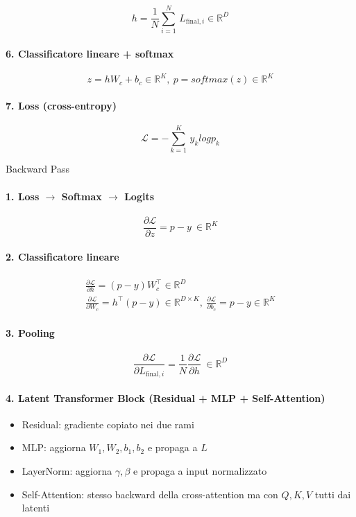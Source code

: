 \documentclass[
  11pt,
]{article}
\begin{document}
\[h = \frac{1}{N}\sum_{i = 1}^{N}\, L_{\text{final},i} \in \mathbb{R}^{D}\]

\paragraph{6. Classificatore lineare + softmax}

\[z = hW_{c} + b_{c} \in \mathbb{R}^{K},\ p = softmax(z) \in \mathbb{R}^{K}\]

\paragraph{7. Loss (cross-entropy)}

\[\mathcal{L} = - \sum_{k = 1}^{K}\, y_{k}logp_{k}\]

Backward Pass

\paragraph{1. Loss $\rightarrow$ Softmax $\rightarrow$ Logits}

\[\frac{\partial\mathcal{L}}{\partial z} = p - y\  \in \mathbb{R}^{K}\]

\paragraph{2. Classificatore lineare}

\[\begin{matrix}
\frac{\partial\mathcal{L}}{\partial h} = (p - y)W_{c}^{\top} \in \mathbb{R}^{D} \\
\frac{\partial\mathcal{L}}{\partial W_{c}} = h^{\top}(p - y) \in \mathbb{R}^{D \times K},\ \frac{\partial\mathcal{L}}{\partial b_{c}} = p - y \in \mathbb{R}^{K}
\end{matrix}\]

\paragraph{3. Pooling}

\[\frac{\partial\mathcal{L}}{\partial L_{\text{final},i}} = \frac{1}{N}\frac{\partial\mathcal{L}}{\partial h}\  \in \mathbb{R}^{D}\]

\paragraph{4. Latent Transformer Block (Residual + MLP + Self-Attention)}

\begin{itemize}
\item
  Residual: gradiente copiato nei due rami
\item
  MLP: aggiorna \(W_{1},W_{2},b_{1},b_{2}\) e propaga a \(L\)
\item
  LayerNorm: aggiorna \(\gamma,\beta\) e propaga a input normalizzato
\item
  Self-Attention: stesso backward della cross-attention ma con \(Q,K,V\)
  tutti dai latenti
\end{itemize}
\end{document}

